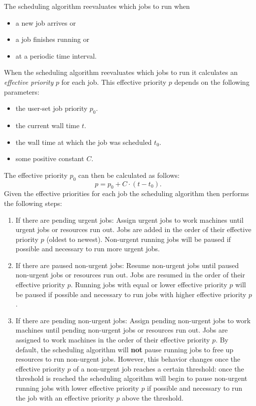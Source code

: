 The scheduling algorithm reevaluates which jobs to run when
\begin{itemize}
  \item a new job arrives or
  \item a job finishes running or
  \item at a periodic time interval.
\end{itemize}
When the scheduling algorithm reevaluates which jobs to run it calculates an \textit{effective priority} $p$ for each job.
This effective priority $p$ depends on the following parameters:
\begin{itemize}
  \item the user-set job priority $p_0$.
  \item the current wall time $t$.
  \item the wall time at which the job was scheduled $t_0$.
  \item some positive constant $C$.
\end{itemize}
The effective priority $p_0$ can then be calculated as follows:
\begin{equation}
p = p_0 + C \cdot (t - t_0).
\end{equation}
Given the effective priorities for each job the scheduling algorithm then performs the following steps:
\begin{enumerate}
  \item If there are pending urgent jobs:
  Assign urgent jobs to work machines until urgent jobs or resources run out.
  Jobs are added in the order of their effective priority $p$ (oldest to newest).
  Non-urgent running jobs will be paused if possible and necessary to run more urgent jobs.
  \item If there are paused non-urgent jobs:
  Resume non-urgent jobs until paused non-urgent jobs or resources run out.
  Jobs are resumed in the order of their effective priority $p$.
  Running jobs with equal or lower effective priority $p$ will be paused if possible and necessary to run jobs with higher effective priority $p$.
  \item If there are pending non-urgent jobs:
  Assign pending non-urgent jobs to work machines until pending non-urgent jobs or resources run out.
  Jobs are assigned to work machines in the order of their effective priority $p$.
  By default, the scheduling algorithm will \textbf{not} pause running jobs to free up resources to run non-urgent jobs.
  However, this behavior changes once the effective priority $p$ of a non-urgent job reaches a certain threshold:
  once the threshold is reached the scheduling algorithm will begin to pause non-urgent running jobs with lower effective priority $p$ if possible and necessary to run the job with an effective priority $p$ above the threshold.
\end{enumerate}

